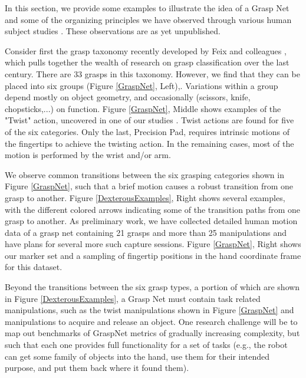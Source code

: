 In this section, we provide some examples to illustrate the idea of a Grasp Net and some of the organizing principles we have observed through various human subject studies \cite{Liu2014, JiaDatabase, Chang:2009:RSSWorkshop, Chang:2014, liu2016annotating}.    These observations are as yet unpublished.

Consider first the grasp taxonomy recently developed by Feix and colleagues \cite{feixgrasp}, which pulls together the wealth of research on grasp classification over the last century.   There are 33 grasps in this taxonomy.  However, we find that they can be placed into six groups (Figure \ref{GraspNet}, Left),.  Variations within a group depend mostly on object geometry, and occasionally (scissors, knife, chopsticks,...) on function.    Figure \ref{GraspNet}, Middle shows examples of the "Twist" action, uncovered in one of our studies \cite{liu2016annotating}.    Twist actions are found for five of the six categories.   Only the last, Precision Pad, requires intrinsic motions of the fingertips to achieve the twisting action.   In the remaining cases, most of the motion is performed by the wrist and/or arm.

We observe common transitions between the six grasping categories shown in Figure \ref{GraspNet}, such that a brief motion causes a robust transition from one grasp to another.   Figure \ref{DexterousExamples}, Right shows several examples, with the different colored arrows indicating some of the transition paths from one grasp to another.   As preliminary work, we have collected detailed human motion data of a grasp net containing 21 grasps and more than 25 manipulations and have plans for several more such capture sessions.    Figure \ref{GraspNet}, Right shows our marker set and a sampling of fingertip positions in the hand coordinate frame for this dataset.

Beyond the transitions between the six grasp types, a portion of which are shown in Figure \ref{DexterousExamples}, a Grasp Net must contain task related manipulations, such as the twist manipulations shown in Figure \ref{GraspNet} and manipulations to acquire and release an object.   One research challenge will be to map out benchmarks of GraspNet metrics of gradually increasing complexity, but such that each one provides full functionality for a set of tasks (e.g., the robot can get some family of objects into the hand, use them for their intended purpose, and put them back where it found them).
